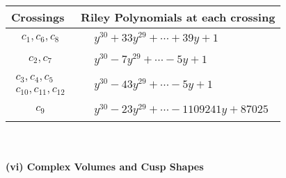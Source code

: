 \documentclass[1p]{elsarticle_modified}
\theoremstyle{definition}
\begin{document}
\begin{tabular}{m{50pt}|m{274pt}}
Crossings & \hspace{64pt}Riley Polynomials at each crossing \\
\hline $$\begin{aligned}c_{1},c_{6},c_{8}\end{aligned}$$&$\begin{aligned}
&y^{30}+33 y^{29}+\cdots+39 y+1
\end{aligned}$\\
\hline $$\begin{aligned}c_{2},c_{7}\end{aligned}$$&$\begin{aligned}
&y^{30}-7 y^{29}+\cdots-5 y+1
\end{aligned}$\\
\hline $$\begin{aligned}c_{3},c_{4},c_{5}\\c_{10},c_{11},c_{12}\end{aligned}$$&$\begin{aligned}
&y^{30}-43 y^{29}+\cdots-5 y+1
\end{aligned}$\\
\hline $$\begin{aligned}c_{9}\end{aligned}$$&$\begin{aligned}
&y^{30}-23 y^{29}+\cdots-1109241 y+87025
\end{aligned}$\\
\hline
\end{tabular}\\~\\
\newpage\flushleft \textbf{(vi) Complex Volumes and Cusp Shapes}
\end{document}
